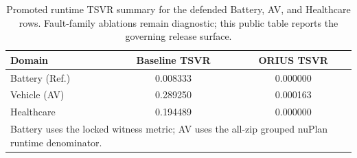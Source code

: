 \begin{table}[htbp]
\centering\small
\caption{Promoted runtime TSVR summary for the defended Battery, AV, and Healthcare rows. Fault-family ablations remain diagnostic; this public table reports the governing release surface.}
\label{tab:fault_type_breakdown_per_domain}
\begin{tabular}{lcc}
\toprule
\textbf{Domain} & \textbf{Baseline TSVR} & \textbf{ORIUS TSVR} \\
\midrule
Battery (Ref.) & 0.008333 & 0.000000 \\
Vehicle (AV) & 0.289250 & 0.000163 \\
Healthcare & 0.194489 & 0.000000 \\
\bottomrule
\multicolumn{3}{l}{\small Battery uses the locked witness metric; AV uses the all-zip grouped nuPlan runtime denominator.}\\
\end{tabular}
\end{table}

